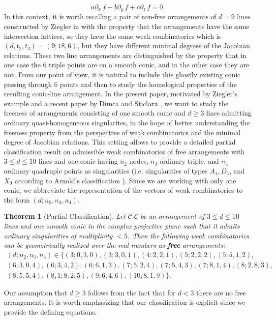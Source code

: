 \documentclass[12pt]{article}
\theoremstyle{plain}
\newtheorem{theorem}[thm]{Theorem}
\theoremstyle{definition}
\renewcommand\geq{\geqslant}
\renewcommand\leq{\leqslant}
\begin{document}
$$a\partial_{x} \, f + b \partial_{y} \, f + c \partial_{z} \, f = 0.$$ In this context, it is worth recalling a pair of non-free arrangements of $d=9$ lines constructed by Ziegler in \cite{Ziegler} with the property that the arrangements have the same intersection lattices, so they have the same weak combinatorics which is $(d,t_{2},t_{3}) = (9;18,6)$, but they have different minimal degrees of the Jacobian relations. These two line arrangements are distinguished by the property that in one case the $6$ triple points are on a smooth conic, and in the other case they are not. From our point of view, it is natural to include this ghostly existing conic passing through $6$ points and then to study the homological properties of the resulting conic-line arrangement. 
In the present paper, motivated by Ziegler's example and a recent paper by Dimca and Sticlaru \cite{DiSti}, we want to study the freeness of arrangements consisting of one smooth conic and $d\geq 3$ lines admitting ordinary quasi-homogeneous singularites, in the hope of better understanding the freeness property from the perspective of weak combinatorics and the minimal degree of Jacobian relations. This setting allows to provide a detailed partial classification result on admissible weak combinatorics of free arrangements with $3 \leq d\leq 10$ lines and one conic having $n_{2}$ nodes, $n_{3}$ ordinary triple, and $n_{4}$ ordinary quadruple points as singularities (i.e. singularities of types $A_{1}, D_{4}$, and $X_9$ according to Arnold's classification \cite{arnold}). Since we are working with only one conic, we abbreviate the representation of the vectors of weak combinatorics to the form $(d;n_{2},n_{3},n_{4})$.
\begin{theorem}[Partial Classification]
\label{class}
Let $\mathcal{CL}$ be an arrangement of $3\leq d \leq 10$ lines and one smooth conic in the complex projective plane such that it admits ordinary singularities of multiplicity $<5$. Then the following weak combinatorics can be geometrically realized over the real numbers as \textbf{free} arrangements:
\begin{multline*}
(d;n_{2}, n_{3}, n_{4}) \in \{(3;0,3,0),(3;3,0,1),(4;2,2,1),(5;2,2,2),(5;5,1,2),\\
(6;3,0,4),(6;3,4,2),(6;6,1,3), (7;5,2,4), (7;5,4,3), (7;8,1,4), (8;2,8,3), \\ (8;5,5,4),(8,1;8,2,5), (9;6,4,6), (10;8,1,9)\}.
\end{multline*}
\end{theorem}
Our assumption that $d\geq 3$ follows from the fact that for $d<3$ there are no free arrangements. It is worth emphasizing that our classification is explicit since we provide the defining equations.
\end{document}
